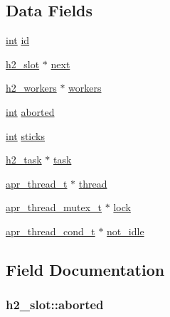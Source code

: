 \subsection*{Data Fields}
\begin{DoxyCompactItemize}
\item 
\hyperlink{pcre_8txt_a42dfa4ff673c82d8efe7144098fbc198}{int} \hyperlink{structh2__slot_a4b036d4099740896ae67ec8eaf98a26e}{id}
\item 
\hyperlink{structh2__slot}{h2\+\_\+slot} $\ast$ \hyperlink{structh2__slot_ac9efe997f0536069bc10c4299af11ba5}{next}
\item 
\hyperlink{structh2__workers}{h2\+\_\+workers} $\ast$ \hyperlink{structh2__slot_abcc9e95506f2ed943f8171f1af7d54f0}{workers}
\item 
\hyperlink{pcre_8txt_a42dfa4ff673c82d8efe7144098fbc198}{int} \hyperlink{structh2__slot_a7936017e94507fbbb4dd1dd31bba45d8}{aborted}
\item 
\hyperlink{pcre_8txt_a42dfa4ff673c82d8efe7144098fbc198}{int} \hyperlink{structh2__slot_a3438b8199e5ea92ef77bf78202cf3d3d}{sticks}
\item 
\hyperlink{structh2__task}{h2\+\_\+task} $\ast$ \hyperlink{structh2__slot_ab59aafc8a725239060ea627b2591def2}{task}
\item 
\hyperlink{structapr__thread__t}{apr\+\_\+thread\+\_\+t} $\ast$ \hyperlink{structh2__slot_aee61c07c369d8a2e3185f7fbfb970b8f}{thread}
\item 
\hyperlink{structapr__thread__mutex__t}{apr\+\_\+thread\+\_\+mutex\+\_\+t} $\ast$ \hyperlink{structh2__slot_a8e2294d3d4b2cfd313422636c7ad70d2}{lock}
\item 
\hyperlink{structapr__thread__cond__t}{apr\+\_\+thread\+\_\+cond\+\_\+t} $\ast$ \hyperlink{structh2__slot_af4f87b02b2459c09917d9bd9c9674630}{not\+\_\+idle}
\end{DoxyCompactItemize}


\subsection{Field Documentation}
\subsubsection[{\texorpdfstring{aborted}{aborted}}]{ h2\+\_\+slot\+::aborted}\hypertarget{structh2__slot_a7936017e94507fbbb4dd1dd31bba45d8}{}\label{structh2__slot_a7936017e94507fbbb4dd1dd31bba45d8}
